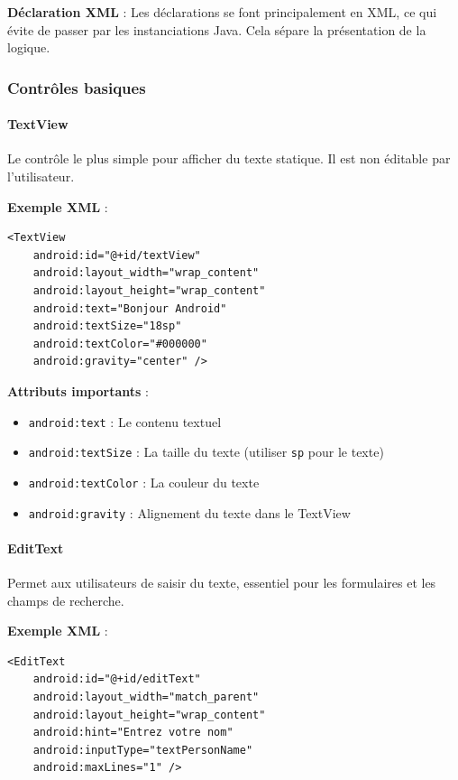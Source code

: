 \documentclass[11pt,a4paper]{article}
\begin{document}
\textbf{Déclaration XML} : Les déclarations se font principalement en XML, ce qui évite de passer par les instanciations Java. Cela sépare la présentation de la logique.

\subsubsection{Contrôles basiques}

\paragraph{TextView}

Le contrôle le plus simple pour afficher du texte statique. Il est non éditable par l'utilisateur.

\textbf{Exemple XML} :
\begin{lstlisting}[style=XML]
<TextView
    android:id="@+id/textView"
    android:layout_width="wrap_content"
    android:layout_height="wrap_content"
    android:text="Bonjour Android"
    android:textSize="18sp"
    android:textColor="#000000"
    android:gravity="center" />
\end{lstlisting}

\textbf{Attributs importants} :
\begin{itemize}
    \item \texttt{android:text} : Le contenu textuel
    \item \texttt{android:textSize} : La taille du texte (utiliser \texttt{sp} pour le texte)
    \item \texttt{android:textColor} : La couleur du texte
    \item \texttt{android:gravity} : Alignement du texte dans le TextView
\end{itemize}

\paragraph{EditText}

Permet aux utilisateurs de saisir du texte, essentiel pour les formulaires et les champs de recherche.

\textbf{Exemple XML} :
\begin{lstlisting}[style=XML]
<EditText
    android:id="@+id/editText"
    android:layout_width="match_parent"
    android:layout_height="wrap_content"
    android:hint="Entrez votre nom"
    android:inputType="textPersonName"
    android:maxLines="1" />
\end{lstlisting}
\end{document}
